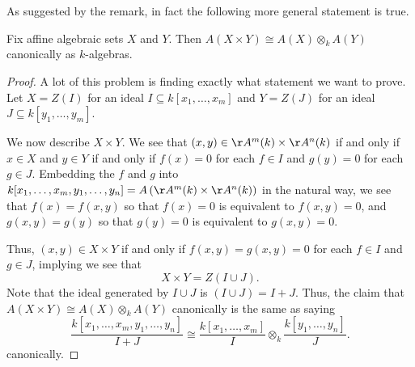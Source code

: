 As suggested by the remark, in fact the following more general statement is true.
\begin{proposition}
	Fix affine algebraic sets $X$ and $Y$. Then $A(X\times Y)\cong A(X)\otimes_kA(Y)$ canonically as $k$-algebras.
\end{proposition}
\begin{proof}
	A lot of this problem is finding exactly what statement we want to prove. Let $X=Z(I)$ for an ideal $I\subseteq k[x_1,\ldots,x_m]$ and $Y=Z(J)$ for an ideal $J\subseteq k[y_1,\ldots,y_m]$.

	We now describe $X\times Y$. We see that $(x,y)\in\AA^m(k)\times\AA^n(k)$ if and only if $x\in X$ and $y\in Y$ if and only if $f(x)=0$ for each $f\in I$ and $g(y)=0$ for each $g\in J.$ Embedding the $f$ and $g$ into $k[x_1,\ldots,x_m,y_1,\ldots,y_n]=A\left(\AA^m(k)\times\AA^n(k)\right)$ in the natural way, we see that $f(x)=f(x,y)$ so that $f(x)=0$ is equivalent to $f(x,y)=0$, and $g(x,y)=g(y)$ so that $g(y)=0$ is equivalent to $g(x,y)=0$.

	Thus, $(x,y)\in X\times Y$ if and only if $f(x,y)=g(x,y)=0$ for each $f\in I$ and $g\in J$, implying we see that
	\[X\times Y=Z(I\cup J).\]
	Note that the ideal generated by $I\cup J$ is $(I\cup J)=I+J$. Thus, the claim that $A(X\times Y)\cong A(X)\otimes_kA(Y)$ canonically is the same as saying
	\[\frac{k[x_1,\ldots,x_m,y_1,\ldots,y_n]}{I+J}\cong\frac{k[x_1,\ldots,x_m]}{I}\otimes_k\frac{k[y_1,\ldots,y_n]}{J}.\]
	canonically.
	

\end{proof}
